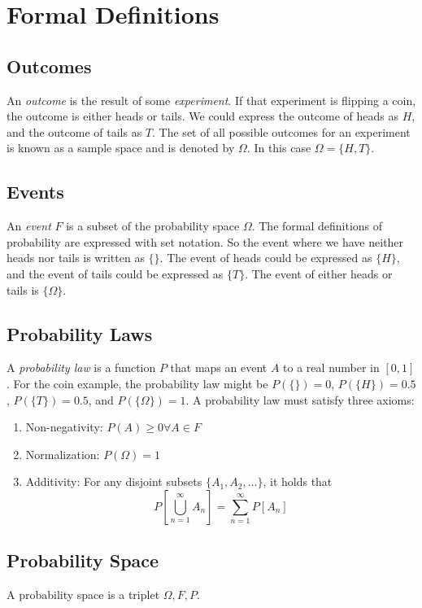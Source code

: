 \section{Formal Definitions}

\subsection{Outcomes}
An \emph{outcome} is the result of some \emph{experiment}.
If that experiment is flipping a coin, the outcome is either
heads or tails. We could express the outcome of heads as $H$,
and the outcome of tails as $T$. The set of all possible
outcomes for an experiment is known as a sample space and is
denoted by $\Omega$. In this case $\Omega = \{H, T\}$.

\subsection{Events}
An \emph{event} $F$ is a subset of the probability space $\Omega$.
The formal definitions of probability are expressed with set
notation. So the event where we have neither heads nor tails is
written as $\{\}$. The event of heads could be expressed as
$\{H\}$, and the event of tails could be expressed as $\{T\}$.
The event of either heads or tails is $\{\Omega\}$.

\subsection{Probability Laws}
A \emph{probability law} is a function $P$ that maps an event $A$
to a real number in $[0, 1]$. For the coin example, the probability
law might be $P(\{\}) = 0$, $P(\{H\}) = 0.5$, $P(\{T\}) = 0.5$, and
$P(\{\Omega\}) = 1$. A probability law must satisfy three axioms:
\begin{enumerate}
    \item Non-negativity: $P(A) \geq 0 \forall A \in F$
    \item Normalization: $P(\Omega) = 1$
    \item Additivity: For any disjoint subsets $\{A_1, A_2, \dots\}$,
          it holds that
          \[P\left[\bigcup_{n=1}^{\infty}A_n\right] = \sum_{n=1}^{\infty}P\left[A_n\right]\]
\end{enumerate}

\subsection{Probability Space}
A probability space is a triplet $\Omega, F, P$.
